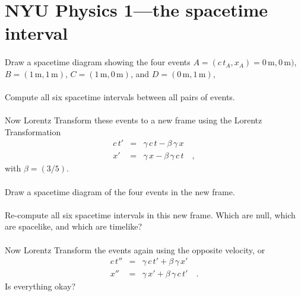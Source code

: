 \documentclass[12pt]{article}
\begin{document}
\renewcommand{\deg}{\mathrm{deg}}
\newcommand{\kg}{\mathrm{kg}}
\newcommand{\m}{\mathrm{m}}
\newcommand{\s}{\mathrm{s}}
\newcommand{\mps}{\m\,\s^{-1}}
\thispagestyle{empty}

\section*{NYU Physics 1---the spacetime interval}

\paragraph{\theproblem}%
Draw a spacetime diagram showing the four events
$A=(c\,t_A,x_A)=0\,\m,0\,\m)$, $B=(1\,\m,1\,\m)$, $C=(1\,\m,0\,\m)$,
and $D=(0\,\m,1\,\m)$,

\paragraph{\theproblem}%
Compute all six spacetime intervals between all pairs of events.

\paragraph{\theproblem}%
Now Lorentz Transform these events to a new frame using the Lorentz
Transformation
\begin{eqnarray}\displaystyle
c\,t' & = & \gamma\,c\,t - \beta\,\gamma\,   x \nonumber\\
   x' & = & \gamma\,   x - \beta\,\gamma\,c\,t \quad ,
\end{eqnarray}
with $\beta=(3/5)$.

\paragraph{\theproblem}%
Draw a spacetime diagram of the four events in the new frame.

\paragraph{\theproblem}%
Re-compute all six spacetime intervals in this new frame.  Which are
null, which are spacelike, and which are timelike?

\paragraph{\theproblem}%
Now Lorentz Transform the events again using the opposite velocity, or
\begin{eqnarray}\displaystyle
c\,t'' & = & \gamma\,c\,t' + \beta\,\gamma\,   x' \nonumber\\
   x'' & = & \gamma\,   x' + \beta\,\gamma\,c\,t' \quad .
\end{eqnarray}
Is everything okay?
\end{document}
